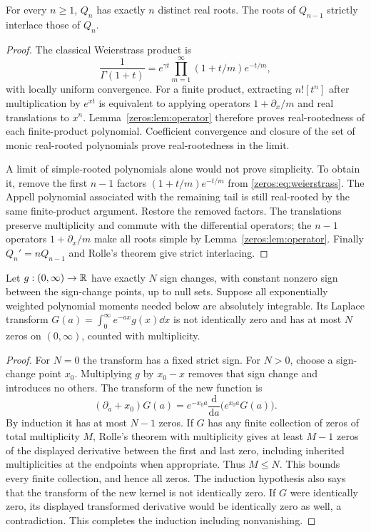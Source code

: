 \begin{theorem}\label{zeros:thm:Qroots}
For every $n\geq1$, $Q_n$ has exactly $n$ distinct real roots. The roots of $Q_{n-1}$ strictly interlace those of $Q_n$.
\end{theorem}
\begin{proof}
The classical Weierstrass product \cite{zeros:DLMFGamma} is
\begin{equation}\label{zeros:eq:weierstrass}
 \frac1{\Gamma(1+t)}=e^{\gamma t}
       \prod_{m=1}^\infty(1+t/m)e^{-t/m},
\end{equation}
with locally uniform convergence. For a finite product, extracting $n![t^n]$ after multiplication by $e^{xt}$ is equivalent to applying operators $1+\partial_x/m$ and real translations to $x^n$. Lemma~\ref{zeros:lem:operator} therefore proves real-rootedness of each finite-product polynomial. Coefficient convergence and closure of the set of monic real-rooted polynomials prove real-rootedness in the limit.

A limit of simple-rooted polynomials alone would not prove simplicity. To obtain it, remove the first $n-1$ factors $(1+t/m)e^{-t/m}$ from \eqref{zeros:eq:weierstrass}. The Appell polynomial associated with the remaining tail is still real-rooted by the same finite-product argument. Restore the removed factors. The translations preserve multiplicity and commute with the differential operators; the $n-1$ operators $1+\partial_x/m$ make all roots simple by Lemma~\ref{zeros:lem:operator}. Finally $Q_n'=nQ_{n-1}$ and Rolle's theorem give strict interlacing.
\end{proof}

\begin{lemma}\label{zeros:lem:variation}
Let $g:(0,\infty)\to\mathbb R$ have exactly $N$ sign changes, with constant nonzero sign between the sign-change points, up to null sets. Suppose all exponentially weighted polynomial moments needed below are absolutely integrable. Its Laplace transform
$G(a)=\int_0^\infty e^{-ax}g(x)\dd x$ is not identically zero and has at most $N$ zeros on $(0,\infty)$, counted with multiplicity.
\end{lemma}
\begin{proof}
For $N=0$ the transform has a fixed strict sign. For $N>0$, choose a sign-change point $x_0$. Multiplying $g$ by $x_0-x$ removes that sign change and introduces no others. The transform of the new function is
\[
 (\partial_a+x_0)G(a)=e^{-x_0a}\frac{\mathrm d}{\mathrm da}\bigl(e^{x_0a}G(a)\bigr).
\]
By induction it has at most $N-1$ zeros. If $G$ has any finite collection of zeros of total multiplicity $M$, Rolle's theorem with multiplicity gives at least $M-1$ zeros of the displayed derivative between the first and last zero, including inherited multiplicities at the endpoints when appropriate. Thus $M\leq N$. This bounds every finite collection, and hence all zeros. The induction hypothesis also says that the transform of the new kernel is not identically zero. If $G$ were identically zero, its displayed transformed derivative would be identically zero as well, a contradiction. This completes the induction including nonvanishing.
\end{proof}

